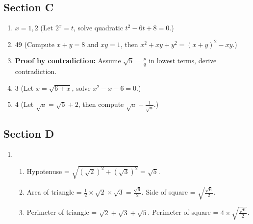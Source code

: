 \documentclass[12pt]{article}
\begin{document}
	\subsection*{Section C}
	\begin{enumerate}[start=11]
		\item $x = 1, 2$ \quad (Let $2^x = t$, solve quadratic $t^2 - 6t + 8 = 0$.)
		\item 49 \quad (Compute $x + y = 8$ and $xy = 1$, then $x^2 + xy + y^2 = (x + y)^2 - xy$.)
		\item \textbf{Proof by contradiction:} Assume $\sqrt{5} = \frac{p}{q}$ in lowest terms, derive contradiction.
		\item 3 \quad (Let $x = \sqrt{6 + x}$, solve $x^2 - x - 6 = 0$.)
		\item 4 \quad (Let $\sqrt{a} = \sqrt{5} + 2$, then compute $\sqrt{a} - \frac{1}{\sqrt{a}}$.)
	\end{enumerate}
	
	\subsection*{Section D}
	\begin{enumerate}[start=16]
		\item 
		\begin{enumerate}[label=(\alph*)]
			\item Hypotenuse = $\sqrt{ (\sqrt{2})^2 + (\sqrt{3})^2 } = \sqrt{5}$.
			\item Area of triangle = $\frac{1}{2} \times \sqrt{2} \times \sqrt{3} = \frac{\sqrt{6}}{2}$. Side of square = $\sqrt{ \frac{\sqrt{6}}{2} }$.
			\item Perimeter of triangle = $\sqrt{2} + \sqrt{3} + \sqrt{5}$. Perimeter of square = $4 \times \sqrt{ \frac{\sqrt{6}}{2} }$.
		\end{enumerate}
	\end{enumerate}
	
\end{document}
